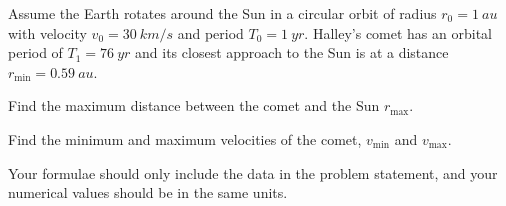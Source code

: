 \documentclass[../TST.tex]{subfiles}
\begin{document}
\begin{pproblem}
Assume the Earth rotates around the Sun in a circular orbit of radius $r_0=\qty{1}{au}$ with velocity $v_0=\qty{30}{km/s}$ and period $T_0=\qty{1}{yr}$. Halley's comet has an orbital period of $T_1=\qty{76}{yr}$ and its closest approach to the Sun is at a distance $r_\mathrm{min}=\qty{0.59}{au}$.
\begin{subpart}
	\item Find the maximum distance between the comet and the Sun $r_\mathrm{max}$. 
	\item Find the minimum and maximum velocities of the comet, $v_\mathrm{min}$ and $v_\mathrm{max}$.
\end{subpart}
Your formulae should only include the data in the problem statement, and your numerical values should be in the same units.
\end{pproblem}
\ifprob \else
\end{document}
